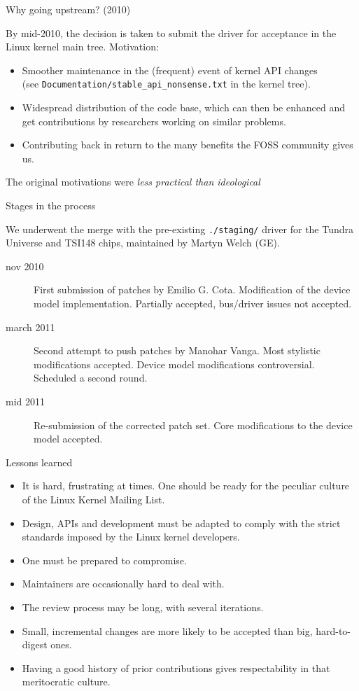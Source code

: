\documentclass{beamer}
\begin{document}
\begin{frame}{Why going upstream? (2010)}

By mid-2010, the decision is taken to submit the driver for acceptance
in the Linux kernel main tree. Motivation:

\begin{itemize}
\item Smoother maintenance in the (frequent) event of kernel API
  changes\\
  (see \texttt{Documentation/stable\_api\_nonsense.txt} in the kernel
  tree).
\item Widespread distribution of the code base, which can then be
    enhanced and get contributions by researchers working on similar
    problems.
\item Contributing back in return to the many benefits the FOSS community
    gives us.
\end{itemize}
The original motivations were \emph{less practical than ideological}
\end{frame}

\begin{frame}{Stages in the process}

We underwent the merge with the pre-existing \texttt{./staging/}
driver for the Tundra Universe and TSI148 chips,
maintained by Martyn Welch (GE).

\begin{description}
\item[nov 2010] First submission of patches by Emilio G. Cota.
    Modification of the device model implementation. Partially accepted,
    bus/driver issues not accepted.
\item[march 2011] Second attempt to push patches by Manohar Vanga.
    Most stylistic modifications accepted. Device model modifications
    controversial. Scheduled a second round.
\item[mid 2011] Re-submission of the corrected patch set. Core
    modifications to the device model accepted.
\end{description}
\end{frame}

\begin{frame}{Lessons learned}
\begin{itemize}
\item It is hard, frustrating at times. One should be ready for the
    peculiar culture of the Linux Kernel Mailing List.
\item Design, APIs and development must be adapted to comply with the strict
    standards imposed by the Linux kernel developers.
\item One must be prepared to compromise.
\item Maintainers are occasionally hard to deal with.
\item The review process may be long, with several iterations.
\item Small, incremental changes are more likely to be accepted than
    big, hard-to-digest ones.
\item Having a good history of prior contributions gives respectability
    in that meritocratic culture.
\end{itemize}
\end{frame}
\end{document}
